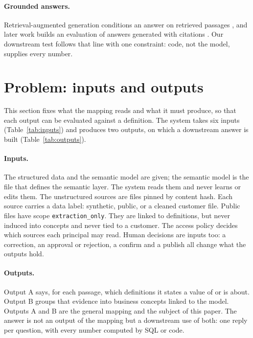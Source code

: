 \documentclass[11pt,a4paper]{article}
\begin{document}
\paragraph{Grounded answers.} Retrieval-augmented generation conditions an answer on retrieved passages \cite{lewis2020rag}, and later work builds an evaluation of answers generated with citations \cite{gao2023alce}. Our downstream test follows that line with one constraint: code, not the model, supplies every number.

\section{Problem: inputs and outputs}\label{sec:io}
This section fixes what the mapping reads and what it must produce, so that each output can be evaluated against a definition. The system takes six inputs (Table~\ref{tab:inputs}) and produces two outputs, on which a downstream answer is built (Table~\ref{tab:outputs}).

\paragraph{Inputs.} The structured data and the semantic model are given; the semantic model is the file that defines the semantic layer. The system reads them and never learns or edits them. The unstructured sources are files pinned by content hash. Each source carries a data label: synthetic, public, or a cleaned customer file. Public files have scope \texttt{extraction\_only}. They are linked to definitions, but never induced into concepts and never tied to a customer. The access policy decides which sources each principal may read. Human decisions are inputs too: a correction, an approval or rejection, a confirm and a publish all change what the outputs hold.



\paragraph{Outputs.} Output A says, for each passage, which definitions it states a value of or is about. Output B groups that evidence into business concepts linked to the model. Outputs A and B are the general mapping and the subject of this paper. The answer is not an output of the mapping but a downstream use of both: one reply per question, with every number computed by SQL or code.


\end{document}
